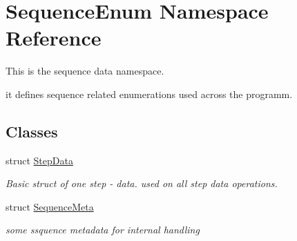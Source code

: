 \hypertarget{namespaceSequenceEnum}{\section{Sequence\-Enum Namespace Reference}
\label{namespaceSequenceEnum}
}


This is the sequence data namespace.\par
 it defines sequence related enumerations used across the programm.  


\subsection*{Classes}
\begin{DoxyCompactItemize}
\item 
struct \hyperlink{structSequenceEnum_1_1StepData}{Step\-Data}
\begin{DoxyCompactList}\small\item\em Basic struct of one step -\/ data. used on all step data operations. \end{DoxyCompactList}\item 
struct \hyperlink{structSequenceEnum_1_1SequenceMeta}{Sequence\-Meta}
\begin{DoxyCompactList}\small\item\em some ssquence metadata for internal handling \end{DoxyCompactList}\end{DoxyCompactItemize}
